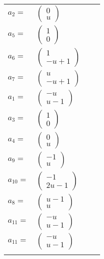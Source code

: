 \documentclass[1p]{elsarticle_modified}
\theoremstyle{definition}
\begin{document}
\begin{tabular}{m{7pt} m{180pt} m{7pt} m{180pt} }
\flushright $a_{2}=$&$\begin{pmatrix}0\\u\end{pmatrix}$ \\
\flushright $a_{5}=$&$\begin{pmatrix}1\\0\end{pmatrix}$ \\
\flushright $a_{6}=$&$\begin{pmatrix}1\\- u+1\end{pmatrix}$ \\
\flushright $a_{7}=$&$\begin{pmatrix}u\\- u+1\end{pmatrix}$ \\
\flushright $a_{1}=$&$\begin{pmatrix}- u\\u-1\end{pmatrix}$ \\
\flushright $a_{3}=$&$\begin{pmatrix}1\\0\end{pmatrix}$ \\
\flushright $a_{4}=$&$\begin{pmatrix}0\\u\end{pmatrix}$ \\
\flushright $a_{9}=$&$\begin{pmatrix}-1\\u\end{pmatrix}$ \\
\flushright $a_{10}=$&$\begin{pmatrix}-1\\2 u-1\end{pmatrix}$ \\
\flushright $a_{8}=$&$\begin{pmatrix}u-1\\u\end{pmatrix}$ \\
\flushright $a_{11}=$&$\begin{pmatrix}- u\\u-1\end{pmatrix}$\\ \flushright $a_{11}=$&$\begin{pmatrix}- u\\u-1\end{pmatrix}$\\&\end{tabular}
\end{document}
